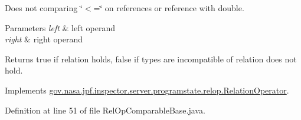 Does not comparing \char`\"{}$<$=\char`\"{} on references or reference with double.


\begin{DoxyParams}{Parameters}
{\em left} & left operand \\
\hline
{\em right} & right operand \\
\hline
\end{DoxyParams}
\begin{DoxyReturn}{Returns}
true if relation holds, false if types are incompatible of relation does not hold. 
\end{DoxyReturn}


Implements \hyperlink{interfacegov_1_1nasa_1_1jpf_1_1inspector_1_1server_1_1programstate_1_1relop_1_1_relation_operator_ad35e4918d8de2de096c7d8035352a3ec}{gov.\+nasa.\+jpf.\+inspector.\+server.\+programstate.\+relop.\+Relation\+Operator}.



Definition at line 51 of file Rel\+Op\+Comparable\+Base.\+java.


